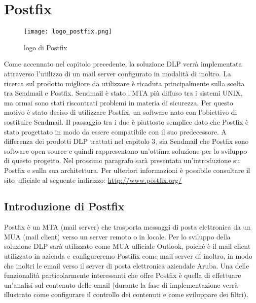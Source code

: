 \chapter{Postfix}

\begin{figure}[htp]
    \centering
    \texttt{[image: logo\_postfix.png]}
        \caption{logo di Postfix}\label{logoPostfix}
  \end{figure}
  
  Come accennato nel capitolo precedente, la soluzione DLP verrà implementata attraverso l'utilizzo di un 
  mail server configurato in modalità di inoltro.
  La ricerca sul prodotto migliore da utilizzare è ricaduta principalmente sulla scelta tra Sendmail e Postfix. 
  Sendmail è stato l'MTA più diffuso tra i sistemi UNIX, ma ormai sono stati riscontrati problemi in materia
  di sicurezza. 
  Per questo motivo è stato deciso di utilizzare Postfix, un software nato con l'obiettivo di sostituire Sendmail. Il passaggio
  tra i due è piuttosto semplice dato che Postfix è stato progettato in modo da essere compatibile con il 
  suo predecessore.
  A differenza dei prodotti DLP trattati nel capitolo 3, sia Sendmail che Postfix sono software open source e
  quindi rappresentano un'ottima soluzione per lo sviluppo di questo progetto.
  Nel prossimo paragrafo sarà presentata un'introduzione su Postfix e sulla sua architettura. Per ulteriori
  informazioni è possibile consultare il sito ufficiale al seguente indirizzo: \url{http://www.postfix.org/}
   
  \pagebreak
  \section{Introduzione di Postfix}
  Postfix è un MTA (mail server) che trasporta messaggi di posta elettronica da un MUA (mail client) verso un server remoto o in locale. Per lo sviluppo della soluzione DLP sarà utilizzato come MUA ufficiale Outlook, poiché è il mail client utilizzato in azienda e configureremo Postifix come mail server di inoltro, in modo che inoltri le email verso il server di posta elettronica aziendale Aruba. Una delle funzionalità particolarmente interessanti che offre Postfix è quella di effettuare un’analisi sul contenuto delle email (durante la fase di implementazione verrà illustrato come configurare il controllo dei contenuti e come sviluppare dei filtri).
  
